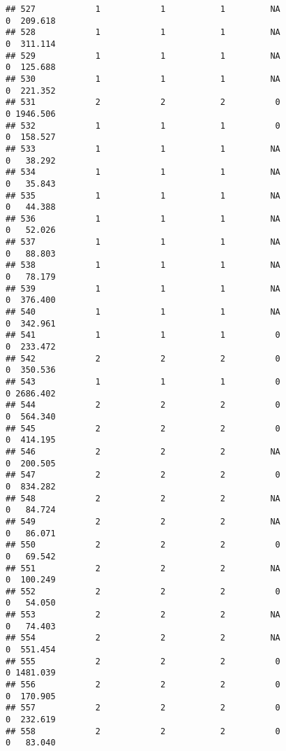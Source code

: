 \documentclass[
]{article}
\begin{document}
\begin{verbatim}
## 527            1            1           1         NA                0  209.618
## 528            1            1           1         NA                0  311.114
## 529            1            1           1         NA                0  125.688
## 530            1            1           1         NA                0  221.352
## 531            2            2           2          0                0 1946.506
## 532            1            1           1          0                0  158.527
## 533            1            1           1         NA                0   38.292
## 534            1            1           1         NA                0   35.843
## 535            1            1           1         NA                0   44.388
## 536            1            1           1         NA                0   52.026
## 537            1            1           1         NA                0   88.803
## 538            1            1           1         NA                0   78.179
## 539            1            1           1         NA                0  376.400
## 540            1            1           1         NA                0  342.961
## 541            1            1           1          0                0  233.472
## 542            2            2           2          0                0  350.536
## 543            1            1           1          0                0 2686.402
## 544            2            2           2          0                0  564.340
## 545            2            2           2          0                0  414.195
## 546            2            2           2         NA                0  200.505
## 547            2            2           2          0                0  834.282
## 548            2            2           2         NA                0   84.724
## 549            2            2           2         NA                0   86.071
## 550            2            2           2          0                0   69.542
## 551            2            2           2         NA                0  100.249
## 552            2            2           2          0                0   54.050
## 553            2            2           2         NA                0   74.403
## 554            2            2           2         NA                0  551.454
## 555            2            2           2          0                0 1481.039
## 556            2            2           2          0                0  170.905
## 557            2            2           2          0                0  232.619
## 558            2            2           2          0                0   83.040

\end{verbatim}
\end{document}
